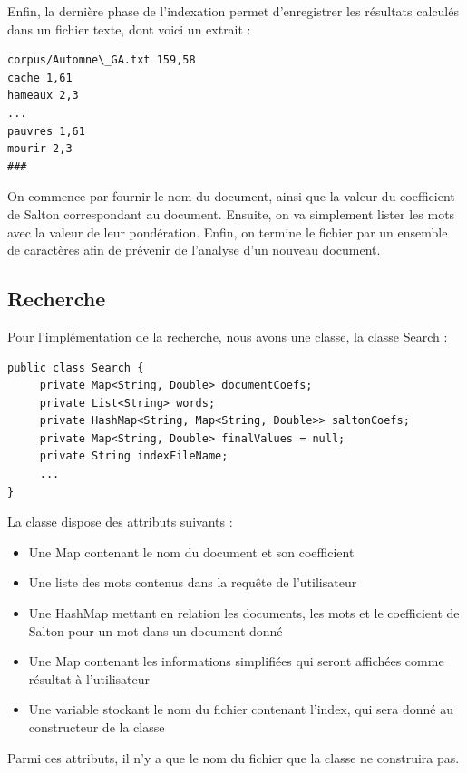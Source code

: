 \documentclass{article}
\begin{document}
Enfin, la dernière phase de l'indexation permet d'enregistrer les résultats calculés dans un
fichier texte, dont voici un extrait :

\begin{lstlisting}
corpus/Automne\_GA.txt 159,58
cache 1,61
hameaux 2,3
...
pauvres 1,61
mourir 2,3
###
\end{lstlisting}

On commence par fournir le nom du document, ainsi que la valeur du coefficient de Salton
correspondant au document. Ensuite, on va simplement lister les mots avec la valeur de leur
pondération. Enfin, on termine le fichier par un ensemble de caractères afin de prévenir de
l'analyse d'un nouveau document.

\subsection{Recherche}

Pour l'implémentation de la recherche, nous avons une classe, la classe Search :

\begin{lstlisting}
public class Search {
     private Map<String, Double> documentCoefs;
     private List<String> words;
     private HashMap<String, Map<String, Double>> saltonCoefs;
     private Map<String, Double> finalValues = null;
     private String indexFileName;
     ...
}
\end{lstlisting}

La classe dispose des attributs suivants :
\begin{itemize}
  \item Une Map contenant le nom du document et son coefficient
  \item Une liste des mots contenus dans la requête de l'utilisateur
  \item Une HashMap mettant en relation les documents, les mots et le coefficient de Salton pour un mot dans un document donné
  \item Une Map contenant les informations simplifiées qui seront affichées comme résultat à l'utilisateur
  \item Une variable stockant le nom du fichier contenant l'index, qui sera donné au constructeur de la classe
\end{itemize}
Parmi ces attributs, il n'y a que le nom du fichier que la classe ne construira pas.\\
\end{document}
